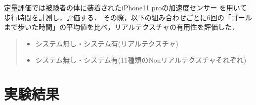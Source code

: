 定量評価では被験者の体に装着されたiPhone11 proの加速度センサー
を用いて歩行時間を計測し，評価する．
その際，以下の組み合わせごとに6回の「ゴールまで歩いた時間」の平均値を比べ，リアルテクスチャの有用性を評価した．
\begin{quote}
    \begin{itemize}
        \item システム無し・システム有(リアルテクスチャ)
        \item システム無し・システム有(11種類のNonリアルテクスチャそれぞれ)
    \end{itemize}
\end{quote}







\section{実験結果}

